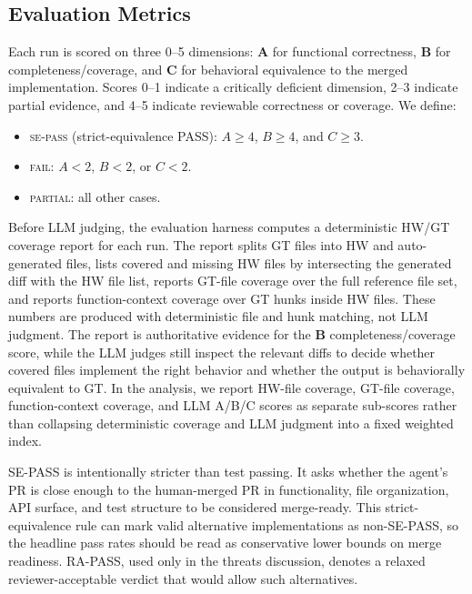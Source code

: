 \subsection{Evaluation Metrics}
\label{sec:eval-framework}

Each run is scored on three 0--5 dimensions: \textbf{A} for functional correctness, \textbf{B} for completeness/coverage, and \textbf{C} for behavioral equivalence to the merged implementation. Scores 0--1 indicate a critically deficient dimension, 2--3 indicate partial evidence, and 4--5 indicate reviewable correctness or coverage. We define:
\begin{itemize}
  \item \textsc{se-pass} (strict-equivalence PASS): $A \geq 4$, $B \geq 4$, and $C \geq 3$.
  \item \textsc{fail}: $A < 2$, $B < 2$, or $C < 2$.
  \item \textsc{partial}: all other cases.
\end{itemize}

Before LLM judging, the evaluation harness computes a deterministic HW/GT coverage report for each run. The report splits GT files into HW and auto-generated files, lists covered and missing HW files by intersecting the generated diff with the HW file list, reports GT-file coverage over the full reference file set, and reports function-context coverage over GT hunks inside HW files. These numbers are produced with deterministic file and hunk matching, not LLM judgment. The report is authoritative evidence for the \textbf{B} completeness/coverage score, while the LLM judges still inspect the relevant diffs to decide whether covered files implement the right behavior and whether the output is behaviorally equivalent to GT. In the analysis, we report HW-file coverage, GT-file coverage, function-context coverage, and LLM A/B/C scores as separate sub-scores rather than collapsing deterministic coverage and LLM judgment into a fixed weighted index.

SE-PASS is intentionally stricter than test passing. It asks whether the agent's PR is close enough to the human-merged PR in functionality, file organization, API surface, and test structure to be considered merge-ready. This strict-equivalence rule can mark valid alternative implementations as non-SE-PASS, so the headline pass rates should be read as conservative lower bounds on merge readiness. RA-PASS, used only in the threats discussion, denotes a relaxed reviewer-acceptable verdict that would allow such alternatives.

